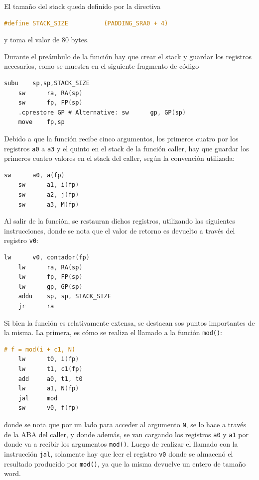 \documentclass[a4paper,12pt]{article}
\numberwithin{equation}{section}
\numberwithin{figure}{section}
\begin{document}
	El tamaño del stack queda definido por la directiva
	\begin{lstlisting}[language=C, style=StyleC]
	#define STACK_SIZE          (PADDING_SRA0 + 4)
	\end{lstlisting}
	y toma el valor de \SI{80}{} bytes.
	
	Durante el preámbulo de la función hay que crear el stack y guardar los registros necesarios, como se muestra en el siguiente fragmento de código
	\begin{lstlisting}[language=C, style=StyleC]
	subu    sp,sp,STACK_SIZE
	sw      ra, RA(sp)
	sw	    fp, FP(sp)
	.cprestore GP # Alternative: sw      gp, GP(sp)
	move    fp,sp
	\end{lstlisting}
	
	Debido a que la función recibe cinco argumentos, los primeros cuatro por los registros \texttt{a0} a \texttt{a3} y el quinto en el stack de la función caller, hay que guardar los primeros cuatro valores en el stack del caller, según la convención utilizada:
	\begin{lstlisting}[language=C, style=StyleC]
	sw      a0, a(fp)
	sw      a1, i(fp)
	sw      a2, j(fp)
	sw      a3, M(fp)
	\end{lstlisting}
	
	Al salir de la función, se restauran dichos registros, utilizando las siguientes instrucciones, donde se nota que el valor de retorno es devuelto a través del registro \texttt{v0}:
	\begin{lstlisting}[language=C, style=StyleC]
	lw		v0, contador(fp)
	lw      ra, RA(sp)
	lw      fp, FP(sp)
	lw      gp, GP(sp)
	addu    sp, sp, STACK_SIZE
	jr		ra
	\end{lstlisting}
	
	Si bien la función es relativamente extensa, se destacan sos puntos importantes de la misma. La primera, es cómo se realiza el llamado a la función \texttt{mod()}:
	\begin{lstlisting}[language=C, style=StyleC]
	# f = mod(i + c1, N)
	lw		t0, i(fp)
	lw		t1, c1(fp)
	add     a0, t1, t0
	lw		a1, N(fp)
	jal		mod
	sw		v0, f(fp)
	\end{lstlisting}
	donde se nota que por un lado para acceder al argumento \texttt{N}, se lo hace a través de la ABA del caller, y donde además, se van cargando los registros \texttt{a0} y \texttt{a1} por donde va a recibir los argumentos \texttt{mod()}. Luego de realizar el llamado con la instrucción \texttt{jal}, solamente hay que leer el registro \texttt{v0} donde se almacenó el resultado producido por \texttt{mod()}, ya que la misma devuelve un entero de tamaño word.
	
\end{document}
